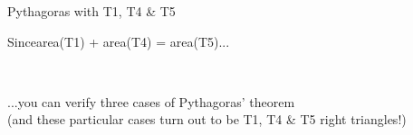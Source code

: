 \documentclass[14pt]{beamer}
\begin{document}
    \begin{frame}{Pythagoras with T1, T4 \& T5}
        \begin{center}
            Since\quad area(T1) + area(T4) = area(T5)\quad...

            \bigskip \bigskip

            \!\!\!\!
            \qquad
             \\

            \bigskip \bigskip

            ...you can verify three cases of Pythagoras' theorem\\
            {\footnotesize (and these particular cases turn out to be T1, T4 \& T5 right triangles!)}
        \end{center}
    \end{frame}
\end{document}
